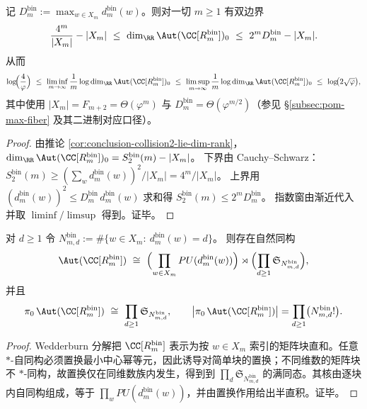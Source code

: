 \begin{corollary}[连续规范对称维度的黄金夹逼与指数窗]\label{cor:conclusion-golden-squeeze-dim-aut}
记 \(D_m^{\mathrm{bin}}:=\max_{w\in X_m}d_m^{\mathrm{bin}}(w)\)。则对一切 \(m\ge 1\) 有双边界
\[
\frac{4^m}{|X_m|}-|X_m|
\ \le\
\dim_{\RR}\Aut(\CC[R_m^{\mathrm{bin}}])_0
\ \le\
2^mD_m^{\mathrm{bin}}-|X_m|.
\]
从而
\[
\log\!\Bigl(\frac4\varphi\Bigr)
\ \le\
\liminf_{m\to\infty}\frac1m\log \dim_{\RR}\Aut(\CC[R_m^{\mathrm{bin}}])_0
\ \le\
\limsup_{m\to\infty}\frac1m\log \dim_{\RR}\Aut(\CC[R_m^{\mathrm{bin}}])_0
\ \le\
\log\!\bigl(2\sqrt\varphi\bigr),
\]
其中使用 \(|X_m|=F_{m+2}=\Theta(\varphi^m)\) 与 \(D_m^{\mathrm{bin}}=\Theta(\varphi^{m/2})\)（参见 \S\ref{subsec:pom-max-fiber} 及其二进制对应口径）。
\end{corollary}
\begin{proof}
由推论 \ref{cor:conclusion-collision2-lie-dim-rank}，
\(
\dim_{\RR}\Aut(\CC[R_m^{\mathrm{bin}}])_0=S_2^{\mathrm{bin}}(m)-|X_m|
\)。
下界由 Cauchy--Schwarz：
\(
S_2^{\mathrm{bin}}(m)\ge (\sum_w d_m^{\mathrm{bin}}(w))^2/|X_m|=4^m/|X_m|
\)。
上界用 \((d_m^{\mathrm{bin}}(w))^2\le D_m^{\mathrm{bin}}\,d_m^{\mathrm{bin}}(w)\) 求和得
\(
S_2^{\mathrm{bin}}(m)\le 2^mD_m^{\mathrm{bin}}
\)。
指数窗由渐近代入并取 \(\liminf/\limsup\) 得到。证毕。
\end{proof}

\begin{proposition}[全体 \(\ast\)-自同构群的分量结构]\label{prop:conclusion-aut-components}
对 \(d\ge 1\) 令
\(
N_{m,d}^{\mathrm{bin}}:=\#\{w\in X_m:\ d_m^{\mathrm{bin}}(w)=d\}
\)。
则存在自然同构
\[
\Aut(\CC[R_m^{\mathrm{bin}}])
\ \cong\
\Bigl(\prod_{w\in X_m}PU(d_m^{\mathrm{bin}}(w))\Bigr)\rtimes
\Bigl(\prod_{d\ge 1}\mathfrak{S}_{N_{m,d}^{\mathrm{bin}}}\Bigr),
\]
并且
\[
\pi_0\,\Aut(\CC[R_m^{\mathrm{bin}}])
\ \cong\ \prod_{d\ge 1}\mathfrak{S}_{N_{m,d}^{\mathrm{bin}}},
\qquad
\bigl|\pi_0\,\Aut(\CC[R_m^{\mathrm{bin}}])\bigr|
=\prod_{d\ge 1} \bigl(N_{m,d}^{\mathrm{bin}}!\bigr).
\]
\end{proposition}
\begin{proof}
Wedderburn 分解把 \(\CC[R_m^{\mathrm{bin}}]\) 表示为按 \(w\in X_m\) 索引的矩阵块直和。任意 \(\ast\)-自同构必须置换最小中心幂等元，因此诱导对简单块的置换；不同维数的矩阵块不 \(\ast\)-同构，故置换仅在同维数族内发生，得到到 \(\prod_d\mathfrak S_{N_{m,d}^{\mathrm{bin}}}\) 的满同态。其核由逐块内自同构组成，等于 \(\prod_w PU(d_m^{\mathrm{bin}}(w))\)，并由置换作用给出半直积。证毕。
\end{proof}

